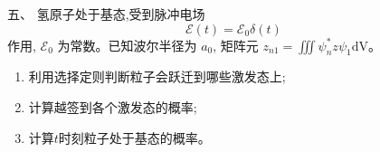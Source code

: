 五、
氢原子处于基态,受到脉冲电场
$$
\mathscr{E}(t)=\mathscr{E}_{0} \delta(t) ~
$$
作用, $\mathscr{E}_{0}$ 为常数。已知波尔半径为 $a_{0}$, 矩阵元 $z_{n 1}=\iiint \psi_{n}^{*} z \psi_{1} \mathrm{dV}$。
\begin{enumerate}
	\item
利用选择定则判断粒子会跃迁到哪些激发态上;
	
	
	\item
	计算越签到各个激发态的概率;
	
	
	\item
	计算$ t $时刻粒子处于基态的概率。
	
	
	
	
	
	
\end{enumerate}
